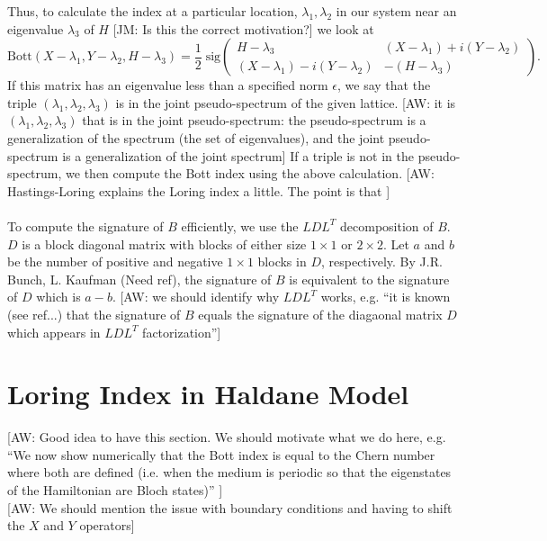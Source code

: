 \documentclass[a4paper]{article}
\newcommand{\aw}[1]{{\color{blue} [AW: #1]}}
\newcommand{\jm}[1]{{\color{red} [JM: #1]}}
\begin{document}
Thus, to calculate the index at a particular location, $\lambda_1,\lambda_2$ in our system near an eigenvalue $\lambda_3$ of $H$ \jm{Is this the correct motivation?} we look at
$$\text{Bott}(X-\lambda_1,Y - \lambda_2, H - \lambda_3) = \frac{1}{2}\; \text{sig}\begin{pmatrix}
H - \lambda_3 & (X - \lambda_1) + i(Y - \lambda_2)\\
(X - \lambda_1) - i(Y - \lambda_2) & - (H - \lambda_3)
\end{pmatrix}.$$
If this matrix has an eigenvalue less than a specified norm $\epsilon$, we say that the triple $(\lambda_1,\lambda_2,\lambda_3)$ is in the joint pseudo-spectrum of the given lattice.\aw{it is $(\lambda_1,\lambda_2,\lambda_3)$ that is in the joint pseudo-spectrum: the pseudo-spectrum is a generalization of the spectrum (the set of eigenvalues), and the joint pseudo-spectrum is a generalization of the joint spectrum}
If a triple is not in the pseudo-spectrum, we then compute the Bott index using the above calculation. \aw{Hastings-Loring explains the Loring index a little. The point is that } \\\\
To compute the signature of $B$ efficiently, we use the $LDL^T$ decomposition of $B$.
$D$ is a block diagonal matrix with blocks of either size $1 \times 1$ or $2 \times 2$.
Let $a$ and $b$ be the number of positive and negative $1 \times 1$ blocks in $D$, respectively.
By J.R. Bunch, L. Kaufman (Need ref), the signature of $B$ is equivalent to the signature of $D$ which is $a - b$. \aw{we should identify why $L D L^T$ works, e.g. ``it is known (see ref...) that the signature of $B$ equals the signature of the diagaonal matrix $D$ which appears in $L D L^T$ factorization''}

\section{Loring Index in Haldane Model}

\aw{Good idea to have this section. We should motivate what we do here, e.g. ``We now show numerically that the Bott index is equal to the Chern number where both are defined (i.e. when the medium is periodic so that the eigenstates of the Hamiltonian are Bloch states)'' }	\\

\aw{We should mention the issue with boundary conditions and having to shift the $X$ and $Y$ operators}
\end{document}
